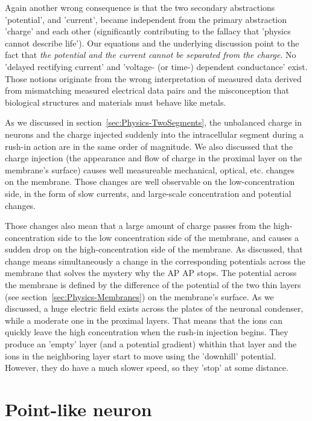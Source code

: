 Again another wrong consequence is that the two secondary abstractions 'potential',
and 'current', became independent from the primary abstraction 'charge'
and each other (significantly contributing to the fallacy that 'physics cannot describe life'). Our equations and the underlying discussion point
to the fact that \emph{the potential and the current cannot be separated
from the charge}. No 'delayed rectifying current' and 'voltage- (or
time-) dependent conductance' exist. Those notions originate from
the wrong interpretation of measured data derived from mismatching
measured electrical data pairs and the misconception that biological
structures and materials must behave like metals.


As we discussed in section~\ref{sec:Physics-TwoSegments}, 
the unbalanced charge in neurons and the charge injected
suddenly into the intracellular segment during a rush-in action
are in the same order of magnitude. We also discussed that 
the charge injection (the appearance and flow of charge in the proximal layer on the membrane's surface) causes well measureable mechanical, optical, etc. changes~\cite{MechanicalWaves:2015} on the membrane.
Those changes are well observable on the low-concentration side, in the form of slow currents, and large-scale
concentration and potential changes.

Those changes also mean that a large amount of charge
passes from the high-concentration side
to the low concentration side of the membrane, and causes a sudden drop
on the high-concentration side of the membrane. As discussed,
that change means simultaneously a change in the corresponding 
potentials across the membrane that solves the mystery why the
\gls{AP}
AP stops. The potential across the membrane is defined by the difference of the
potential of the two thin layers (see section~\ref{sec:Physics-Membranes}) on the membrane's surface.
As we discussed, a huge electric field exists across the
plates of the neuronal condenser, while a moderate one 
in the proximal layers. That means that the ions can quickly
leave the high concentration when the rush-in injection begins.
They produce an 'empty' layer (and a potential gradient)
whithin that layer and the ions in the neighboring layer
start to move using the 'downhill' potential. However, they do have a much slower speed, so they 'stop' at some distance. 




\section{Point-like neuron\label{sec:Physiology-FallaciesPointLike}}

